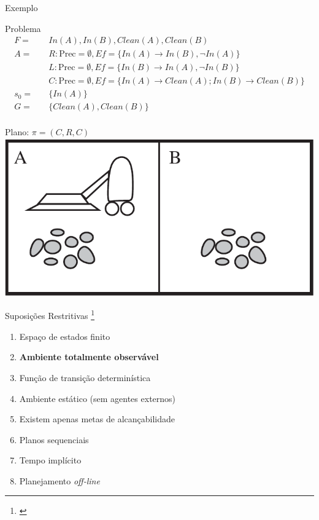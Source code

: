 \begin{frame}{Exemplo}
     \begin{block}{Problema}
        \begin{align*}
                F = \quad  & In(A),In(B),Clean(A),Clean(B) \\
                A = \quad  & R: \text{Prec} = \emptyset, Ef= \{ In(A) \rightarrow In(B),\lnot In(A) \} \\
                           & L: \text{Prec} = \emptyset, Ef= \{ In(B) \rightarrow In(A),\lnot In(B) \} \\
                           & C: \text{Prec} = \emptyset, Ef= \{ In(A)  \rightarrow Clean(A); In(B) \rightarrow Clean(B) \} \\
              s_0 = \quad  & \{ In(A) \} \\
                G = \quad  & \{ Clean(A),Clean(B)  \} \\
        \end{align*}
    \end{block}
    
        \begin{multicols}{2}
            \centering
             Plano: $\pi = (C,R,C)$\\
        \columnbreak
            \includegraphics[scale=0.18]{images/vaccum_cleaner.png}
        \end{multicols}
    
\end{frame}



\begin{frame}{Suposições Restritivas \footnote{\cite{Ghallab:2004}}}
    \begin{enumerate}
        \item Espaço de estados finito 
        \item \textbf{Ambiente totalmente observável} \label{rest2}
        \item Função de transição determinística 
        \item Ambiente estático (sem agentes externos)
        \item Existem apenas metas de alcançabilidade 
        \item Planos sequenciais
        \item Tempo implícito
        \item Planejamento \textit{off-line}
    \end{enumerate}
    
\end{frame}


